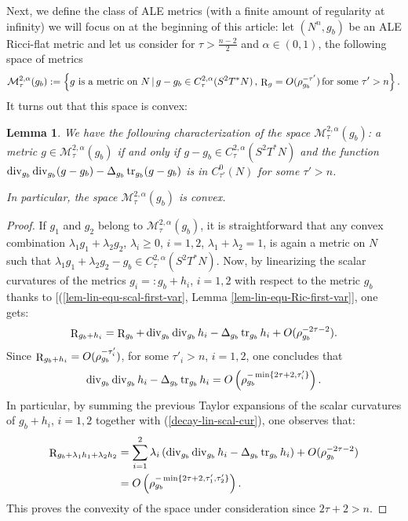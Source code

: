 \documentclass[a4paper,11pt,reqno]{amsart}
\newtheorem{lemma}[defn]{Lemma}
\def\tr{\mathop{\rm tr}\nolimits}
\def\div{\mathop{\rm div}\nolimits}
\def\tr{\mathop{\rm tr}\nolimits}
\def\div{\mathop{\rm div}\nolimits}
\def\R{\mathop{\rm R}\nolimits}
\numberwithin{equation}{section}
\begin{document}
	Next, we define the class of ALE metrics (with a finite amount of regularity at infinity)  we will focus on at the beginning of this article:	
	let $(N^n,g_b)$ be an ALE Ricci-flat metric and let us consider for $\tau>\frac{n-2}{2}$ and $\alpha\in(0,1)$, the following space of metrics 
	\begin{equation}
	\mathcal{M}^{2,\alpha}_{\tau}(g_b):= \left\{\text{$g$ is a metric on $N$}\,|\,g-g_b\in C^{2,\alpha}_{\tau}(S^2T^*N)\,,\, \R_{g} = O(\rho_{g_b}^{-\tau'})\,\text{for some $\tau'>n$}\right\}.
	\end{equation}
	It turns out that this space is convex:
	\begin{lemma}\label{lemm-charac-M}
		We have the following characterization of the space $\mathcal{M}^{2,\alpha}_{\tau}(g_b)$: a metric $g\in \mathcal{M}^{2,\alpha}_{\tau}(g_b)$ if and only if $g-g_b\in C^{2,\alpha}_{\tau}(S^2T^*N)$ and the function $\div_{g_b}\div_{g_b}(g-g_b)-\Delta_{g_b}\tr_{g_b}(g-g_b)$ is in $C^0_{\tau'}(N)$ for some $\tau'>n$. 
		
		In particular, the space $\mathcal{M}^{2,\alpha}_{\tau}(g_b)$ is convex.
	\end{lemma}
	\begin{proof}
		If $g_1$ and $g_2$ belong to $\mathcal{M}^{2,\alpha}_{\tau}(g_b)$, it is straightforward that any convex combination $\lambda_1g_1+\lambda_2g_2$, $\lambda_i\geq 0$, $i=1,2$, $\lambda_1+\lambda_2=1$, is again a metric on $N$ such that $\lambda_1g_1+\lambda_2g_2-g_b\in C_{\tau}^{2,\alpha}(S^2T^*N)$. Now, by linearizing the scalar curvatures of the metrics $g_i=:g_b+h_i$, $i=1,2$ with respect to the metric $g_b$ thanks to [(\ref{lem-lin-equ-scal-first-var}, Lemma \ref{lem-lin-equ-Ric-first-var}], one gets:
		\begin{equation*}
		\R_{g_b+h_i}=\R_{g_b}+\div_{g_b}\div_{g_b}h_i-\Delta_{g_b}\tr_{g_b}h_i+O(\rho_{g_b}^{-2\tau-2}).
		\end{equation*}
		Since $\R_{g_b+h_i}=O(\rho_{g_b}^{-\tau_i'})$, for some $\tau'_i>n$, $i=1,2$, one concludes that 
		\begin{equation}
		\div_{g_b}\div_{g_b}h_i-\Delta_{g_b}\tr_{g_b}h_i=O\left(\rho_{g_b}^{-\min\{2\tau+2,\tau_i'\}}\right).\label{decay-lin-scal-cur}
		\end{equation}
		In particular, by summing the previous Taylor expansions of the scalar curvatures of $g_b+h_i$, $i=1,2$ together with (\ref{decay-lin-scal-cur}), one observes that:
		\begin{equation*}
		\begin{split}
		\R_{g_b+\lambda_1h_1+\lambda_2h_2}&=\sum_{i=1}^2\lambda_i\left(\div_{g_b}\div_{g_b}h_i-\Delta_{g_b}\tr_{g_b}h_i\right)+O(\rho_{g_b}^{-2\tau-2})\\
		&=O\left(\rho_{g_b}^{-\min\{2\tau+2,\tau_1',\tau'_2\}}\right).
		\end{split}
		\end{equation*}
		This proves the convexity of the space under consideration since $2\tau+2>n$.
		
		
		
	\end{proof}
	
\end{document}
